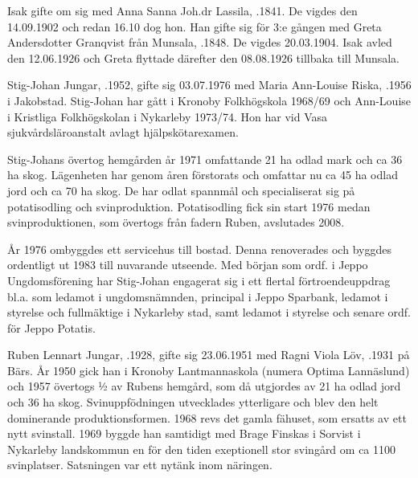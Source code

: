 Isak gifte om sig med Anna Sanna Joh.dr Lassila, .1841. De vigdes den 14.09.1902 och redan 16.10 dog hon. Han gifte sig för 3:e gången med Greta Andersdotter Granqvist från Munsala, .1848. De vigdes 20.03.1904. Isak avled den 12.06.1926 och Greta flyttade därefter den 08.08.1926 tillbaka till Munsala.






Stig-Johan Jungar, .1952, gifte sig 03.07.1976 med Maria Ann-Louise Riska, .1956 i Jakobstad. Stig-Johan har gått i Kronoby Folkhögskola 1968/69 och Ann-Louise i Kristliga Folkhögskolan i Nykarleby 1973/74. Hon har vid Vasa sjukvårdsläroanstalt avlagt hjälpskötarexamen.

Stig-Johans övertog hemgården år 1971 omfattande 21 ha odlad mark och ca 36 ha skog. Lägenheten har genom åren förstorats och omfattar nu ca 45 ha odlad jord och ca 70 ha skog. De har odlat spannmål och specialiserat sig på potatisodling och svinproduktion.  Potatisodling fick sin start 1976 medan svinproduktionen, som övertogs från fadern Ruben, avslutades 2008.

År 1976 ombyggdes ett servicehus till bostad. Denna renoverades och byggdes ordentligt ut 1983 till nuvarande utseende. Med början som ordf. i Jeppo Ungdomsförening har Stig-Johan engagerat sig i ett flertal förtroendeuppdrag bl.a. som ledamot i ungdomsnämnden, principal i Jeppo Sparbank, ledamot i styrelse och fullmäktige i Nykarleby stad, samt ledamot i styrelse och senare ordf. för Jeppo Potatis.





Ruben Lennart Jungar, .1928, gifte sig 23.06.1951 med Ragni Viola Löv, .1931 på Bärs. År 1950 gick han i Kronoby Lantmannaskola (numera Optima Lannäslund) och 1957 övertogs ½ av Rubens hemgård, som då utgjordes av 21 ha odlad jord och 36 ha skog. Svinuppfödningen utvecklades ytterligare och blev den helt dominerande produktionsformen. 1968 revs det gamla fähuset, som ersatts av ett nytt svinstall. 1969 byggde han samtidigt med Brage Finskas i Sorvist i Nykarleby landskommun en för den tiden exeptionell stor svingård om ca 1100 svinplatser. Satsningen var ett nytänk inom näringen.

